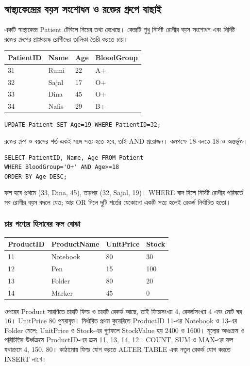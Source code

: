 \subsection{স্বাস্থ্যকেন্দ্রের বয়স সংশোধন ও রক্তের গ্রুপে বাছাই}
একটি স্বাস্থ্যকেন্দ্র Patient টেবিলে নিচের তথ্য রেখেছে। কেন্দ্রটি শুধু নির্দিষ্ট রোগীর বয়স সংশোধন এবং নির্দিষ্ট রক্তের গ্রুপের প্রাপ্তবয়স্ক রোগীদের তালিকা তৈরি করতে চায়।
\begin{flushleft}\small
\begin{tabular}{|l|l|l|l|}\hline
PatientID & Name & Age & BloodGroup\\\hline
31 & Rumi & 22 & A+\\\hline
32 & Sajal & 17 & O+\\\hline
33 & Dina & 45 & O+\\\hline
34 & Nafis & 29 & B+\\\hline
\end{tabular}
\end{flushleft}
\begin{verbatim}
UPDATE Patient SET Age=19 WHERE PatientID=32;
\end{verbatim}
রক্তের গ্রুপ ও বয়সের শর্ত একই সঙ্গে সত্য হতে হবে, তাই AND প্রয়োজন। কমপক্ষে 18 বলতে 18-ও অন্তর্ভুক্ত।
\begin{verbatim}
SELECT PatientID, Name, Age FROM Patient
WHERE BloodGroup='O+' AND Age>=18
ORDER BY Age DESC;
\end{verbatim}
ফল হবে প্রথমে (33, Dina, 45), তারপর (32, Sajal, 19)। WHERE বাদ দিলে নির্দিষ্ট রোগীর পরিবর্তে সব রোগীর বয়স বদলে যেত; আর OR দিলে দুটি শর্তের যেকোনো একটি সত্য হলেই রেকর্ড নির্বাচিত হতো।

\subsubsection{চার পণ্যের হিসাবের ফল বোঝা}
\begin{flushleft}\small
\begin{tabular}{|l|l|l|l|}\hline
ProductID & ProductName & UnitPrice & Stock\\\hline
11 & Notebook & 80 & 30\\\hline
12 & Pen & 15 & 100\\\hline
13 & Folder & 80 & 20\\\hline
14 & Marker & 45 & 0\\\hline
\end{tabular}
\end{flushleft}
ওপরের Product সারণিতে চারটি ফিল্ড ও চারটি রেকর্ড আছে, তাই ফিল্ডসংখ্যা 4, রেকর্ডসংখ্যা 4 এবং মোট ঘর 16। UnitPrice 80 পুনরাবৃত্ত। নির্ধারিত প্রথম কুয়েরিতে ProductID 11-এর Notebook ও 13-এর Folder মেলে; UnitPrice ও Stock-এর গুণফলে StockValue হয় 2400 ও 1600। মূল্যের অধঃক্রম ও পরিচিতির ঊর্ধ্বক্রমে ProductID-এর ক্রম 11, 13, 14, 12। COUNT, SUM ও MAX-এর ফল যথাক্রমে 4, 150, 80। কাঠামোয় ফিল্ড যোগ করতে ALTER TABLE এবং নতুন রেকর্ড যোগ করতে INSERT লাগে।

